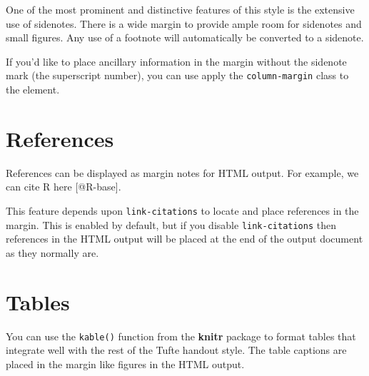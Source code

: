 \documentclass[
  letterpaper,
  DIV=11,
  numbers=noendperiod,
  oneside]{scrartcl}
\begin{document}
One of the most prominent and distinctive features of this style is the
extensive use of sidenotes. There is a wide margin to provide ample room
for sidenotes and small figures. Any use of a footnote will
automatically be converted to a sidenote.

{} If you'd like to place ancillary
information in the margin without the sidenote mark (the superscript
number), you can use apply the \texttt{column-margin} class to the
element.

\hypertarget{references}{%
\section{References}\label{references}}

References can be displayed as margin notes for HTML output. For
example, we can cite R here {[}@R-base{]}.

\begin{tcolorbox}[enhanced jigsaw, left=2mm, opacityback=0, colback=white, colframe=quarto-callout-note-color-frame, arc=.35mm, toprule=.15mm, breakable, leftrule=.75mm, rightrule=.15mm, bottomrule=.15mm]
\begin{minipage}[t]{5.5mm}
\textcolor{quarto-callout-note-color}{\faInfo}
\end{minipage}%
\begin{minipage}[t]{\textwidth - 5.5mm}

This feature depends upon \texttt{link-citations} to locate and place
references in the margin. This is enabled by default, but if you disable
\texttt{link-citations} then references in the HTML output will be
placed at the end of the output document as they normally are.

\end{minipage}%
\end{tcolorbox}

\hypertarget{tables}{%
\section{Tables}\label{tables}}

You can use the \texttt{kable()} function from the \textbf{knitr}
package to format tables that integrate well with the rest of the Tufte
handout style. The table captions are placed in the margin like figures
in the HTML output.
\end{document}
